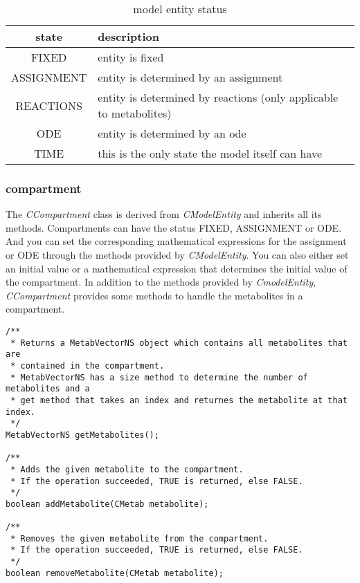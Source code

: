 \documentclass[a4,12pt]{article}
\begin{document}
\begin{table}[ht]
\begin{tabular}{c|l}
state & description \\ \hline \hline
FIXED & entity is fixed \\ \hline
ASSIGNMENT & entity is determined by an assignment \\ \hline
REACTIONS & entity is determined by reactions (only applicable to metabolites) \\ \hline
ODE & entity is determined by an ode \\ \hline
TIME & this is the only state the model itself can have \\ \hline
\end{tabular}
\caption{model entity status}
\label{ModelEntityStatus}
\end{table}

\subsubsection{compartment}
The \textit{CCompartment} class is derived from \textit{CModelEntity} and inherits all its methods. Compartments can have the status FIXED, ASSIGNMENT or ODE. And you can set the corresponding mathematical expressions for the assignment or ODE through the methods provided by \textit{CModelEntity}. You can also either set an initial value or a mathematical expression that determines the initial value of the compartment.
In addition to the methods provided by \textit{CmodelEntity}, \textit{CCompartment} provides some methods to handle the metabolites in a compartment.

\begin{lstlisting}
/**
 * Returns a MetabVectorNS object which contains all metabolites that are
 * contained in the compartment.
 * MetabVectorNS has a size method to determine the number of metabolites and a
 * get method that takes an index and returnes the metabolite at that index.
 */
MetabVectorNS getMetabolites();

/**
 * Adds the given metabolite to the compartment.
 * If the operation succeeded, TRUE is returned, else FALSE.
 */
boolean addMetabolite(CMetab metabolite);

/**
 * Removes the given metabolite from the compartment.
 * If the operation succeeded, TRUE is returned, else FALSE.
 */
boolean removeMetabolite(CMetab metabolite);
\end{lstlisting}
\end{document}
